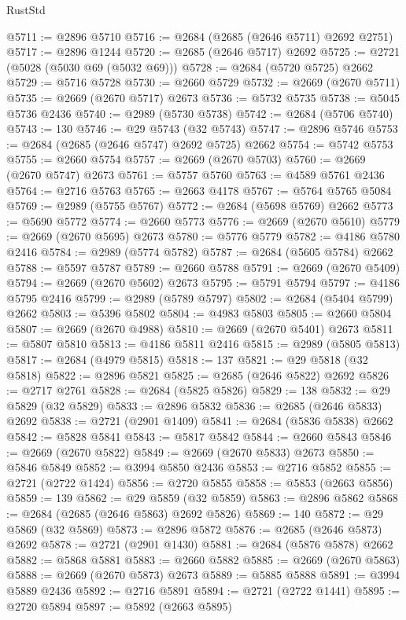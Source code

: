 \begin{lexlean}{RustStd}
\begin{coremodule}
@5711 := @2896 @5710
@5716 := @2684 (@2685 (@2646 @5711) @2692 @2751)
@5717 := @2896 @1244
@5720 := @2685 (@2646 @5717) @2692
@5725 := @2721 (@5028 (@5030 @69 (@5032 @69)))
@5728 := @2684 (@5720 @5725) @2662
@5729 := @5716 @5728
@5730 := @2660 @5729
@5732 := @2669 (@2670 @5711)
@5735 := @2669 (@2670 @5717) @2673
@5736 := @5732 @5735
@5738 := @5045 @5736 @2436
@5740 := @2989 (@5730 @5738)
@5742 := @2684 (@5706 @5740)
@5743 := 130
@5746 := @29 @5743 (@32 @5743)
@5747 := @2896 @5746
@5753 := @2684 (@2685 (@2646 @5747) @2692 @5725) @2662
@5754 := @5742 @5753
@5755 := @2660 @5754
@5757 := @2669 (@2670 @5703)
@5760 := @2669 (@2670 @5747) @2673
@5761 := @5757 @5760
@5763 := @4589 @5761 @2436
@5764 := @2716 @5763
@5765 := @2663 @4178
@5767 := @5764 @5765 @5084
@5769 := @2989 (@5755 @5767)
@5772 := @2684 (@5698 @5769) @2662
@5773 := @5690 @5772
@5774 := @2660 @5773
@5776 := @2669 (@2670 @5610)
@5779 := @2669 (@2670 @5695) @2673
@5780 := @5776 @5779
@5782 := @4186 @5780 @2416
@5784 := @2989 (@5774 @5782)
@5787 := @2684 (@5605 @5784) @2662
@5788 := @5597 @5787
@5789 := @2660 @5788
@5791 := @2669 (@2670 @5409)
@5794 := @2669 (@2670 @5602) @2673
@5795 := @5791 @5794
@5797 := @4186 @5795 @2416
@5799 := @2989 (@5789 @5797)
@5802 := @2684 (@5404 @5799) @2662
@5803 := @5396 @5802
@5804 := @4983 @5803
@5805 := @2660 @5804
@5807 := @2669 (@2670 @4988)
@5810 := @2669 (@2670 @5401) @2673
@5811 := @5807 @5810
@5813 := @4186 @5811 @2416
@5815 := @2989 (@5805 @5813)
@5817 := @2684 (@4979 @5815)
@5818 := 137
@5821 := @29 @5818 (@32 @5818)
@5822 := @2896 @5821
@5825 := @2685 (@2646 @5822) @2692
@5826 := @2717 @2761
@5828 := @2684 (@5825 @5826)
@5829 := 138
@5832 := @29 @5829 (@32 @5829)
@5833 := @2896 @5832
@5836 := @2685 (@2646 @5833) @2692
@5838 := @2721 (@2901 @1409)
@5841 := @2684 (@5836 @5838) @2662
@5842 := @5828 @5841
@5843 := @5817 @5842
@5844 := @2660 @5843
@5846 := @2669 (@2670 @5822)
@5849 := @2669 (@2670 @5833) @2673
@5850 := @5846 @5849
@5852 := @3994 @5850 @2436
@5853 := @2716 @5852
@5855 := @2721 (@2722 @1424)
@5856 := @2720 @5855
@5858 := @5853 (@2663 @5856)
@5859 := 139
@5862 := @29 @5859 (@32 @5859)
@5863 := @2896 @5862
@5868 := @2684 (@2685 (@2646 @5863) @2692 @5826)
@5869 := 140
@5872 := @29 @5869 (@32 @5869)
@5873 := @2896 @5872
@5876 := @2685 (@2646 @5873) @2692
@5878 := @2721 (@2901 @1430)
@5881 := @2684 (@5876 @5878) @2662
@5882 := @5868 @5881
@5883 := @2660 @5882
@5885 := @2669 (@2670 @5863)
@5888 := @2669 (@2670 @5873) @2673
@5889 := @5885 @5888
@5891 := @3994 @5889 @2436
@5892 := @2716 @5891
@5894 := @2721 (@2722 @1441)
@5895 := @2720 @5894
@5897 := @5892 (@2663 @5895)

\end{coremodule}
\end{lexlean}
